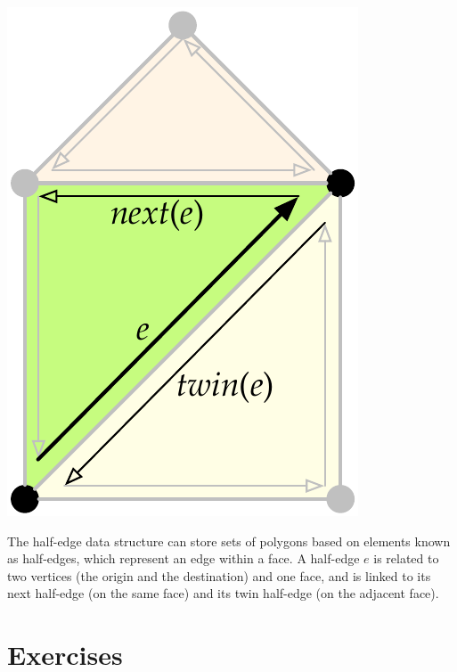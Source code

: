 \begin{marginfigure}
\centering
\includegraphics[width=\linewidth]{figs/halfedge-2.pdf}
\caption{The half-edge data structure can store sets of polygons based on elements known as half-edges, which represent an edge within a face.
A half-edge $e$ is related to two vertices (the origin and the destination) and one face, and is linked to its next half-edge (on the same face) and its twin half-edge (on the adjacent face).}%
\label{fig:halfedge-2}
\end{marginfigure}

%
\section{Exercises}

